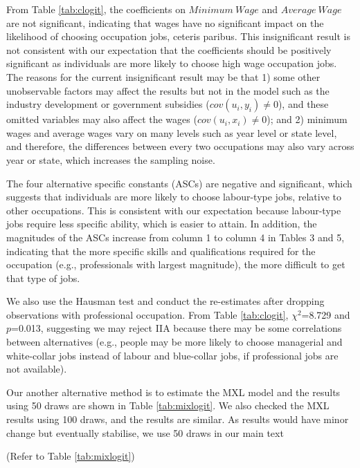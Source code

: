 From Table \ref{tab:clogit}, the coefficients on $\mathit{Minimum\ Wage}$ and $\mathit{Average\ Wage}$ are not significant, indicating that wages have no significant impact on the likelihood of choosing occupation jobs, ceteris paribus.
This insignificant result is not consistent with our expectation that the coefficients should be positively significant as individuals are more likely to choose high wage occupation jobs.
The reasons for the current insignificant result may be that 1) some other unobservable factors may affect the results but not in the model such as the industry development or government subsidies ($\mathit{cov(u_i,y_i)\not=0}$), and these omitted variables may also affect the wages ($\mathit{cov(u_i,x_i)\not=0}$); and 2) minimum wages and average wages vary on many levels such as year level or state level, and therefore, the differences between every two occupations may also vary across year or state, which increases the sampling noise.

The four alternative specific constants (ASCs) are negative and significant, which suggests that individuals are more likely to choose labour-type jobs, relative to other occupations.
This is consistent with our expectation because labour-type jobs require less specific ability, which is easier to attain.
In addition, the magnitudes of the ASCs increase from column 1 to column 4 in Tables 3 and 5, indicating that the more specific skills and qualifications required for the occupation (e.g., professionals with largest magnitude), the more difficult to get that type of jobs.

We also use the Hausman test and conduct the re-estimates after dropping observations with professional occupation.
From Table \ref{tab:clogit}, $\chi^2$=8.729 and $\mathit{p}$=0.013, suggesting we may reject IIA because there may be some correlations between alternatives (e.g., people may be more likely to choose managerial and white-collar jobs instead of labour and blue-collar jobs, if professional jobs are not available).

Our another alternative method is to estimate the MXL model and the results using 50 draws are shown in Table \ref{tab:mixlogit}.
We also checked the MXL results using 100 draws, and the results are similar.
As results would have minor change but eventually stabilise, we use 50 draws in our main text

\begin{center}
(Refer to Table \ref{tab:mixlogit})
\end{center}

